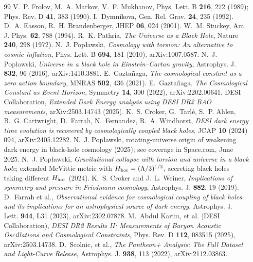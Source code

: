 \documentclass[11pt]{article}
\begin{document}
\begin{thebibliography}{99}
 V.~P. Frolov, M.~A. Markov, V.~F. Mukhanov, Phys. Lett. B \textbf{216}, 272 (1989); Phys. Rev. D \textbf{41}, 383 (1990).
 I.~Dymnikova, Gen. Rel. Grav. \textbf{24}, 235 (1992).
 D.~A. Easson, R.~H. Brandenberger, JHEP \textbf{06}, 024 (2001).
 W.~M. Stuckey, Am. J. Phys. \textbf{62}, 788 (1994).
 R.~K. Pathria, \emph{The Universe as a Black Hole}, Nature \textbf{240}, 298 (1972).
 N.~J. Pop{\l}awski, \emph{Cosmology with torsion: An alternative to cosmic inflation}, Phys. Lett. B \textbf{694}, 181 (2010), arXiv:1007.0587.
 N.~J. Pop{\l}awski, \emph{Universe in a black hole in Einstein--Cartan gravity}, Astrophys. J. \textbf{832}, 96 (2016), arXiv:1410.3881.
 E.~Gazta\~naga, \emph{The cosmological constant as a zero action boundary}, MNRAS \textbf{502}, 436 (2021).
 E.~Gazta\~naga, \emph{The Cosmological Constant as Event Horizon}, Symmetry \textbf{14}, 300 (2022), arXiv:2202.00641.
 DESI Collaboration, \emph{Extended Dark Energy analysis using DESI DR2 BAO measurements}, arXiv:2503.14743 (2025).
 K.~S. Croker, G.~Tarl\'e, S.~P. Ahlen, B.~G. Cartwright, D.~Farrah, N.~Fernandez, R.~A. Windhorst, \emph{DESI dark energy time evolution is recovered by cosmologically coupled black holes}, JCAP \textbf{10} (2024) 094, arXiv:2405.12282.
 N.~J. Pop{\l}awski, rotating-universe origin of weakening dark energy in black-hole cosmology (2025); see coverage in Space.com, June 2025.
 N.~J. Pop{\l}awski, \emph{Gravitational collapse with torsion and universe in a black hole}; extended McVittie metric with $H_{\rm hor} = (\Lambda/3)^{1/2}$, accreting black holes taking different $H_{\rm hor}$ (2024).
 K.~S. Croker and J.~L. Weiner, \emph{Implications of symmetry and pressure in Friedmann cosmology}, Astrophys. J. \textbf{882}, 19 (2019).
 D.~Farrah et al., \emph{Observational evidence for cosmological coupling of black holes and its implications for an astrophysical source of dark energy}, Astrophys. J. Lett. \textbf{944}, L31 (2023), arXiv:2302.07878.
 M.~Abdul Karim, et al. (DESI Collaboration), \emph{DESI DR2 Results II: Measurements of Baryon Acoustic Oscillations and Cosmological Constraints}, Phys. Rev. D \textbf{112}, 083515 (2025), arXiv:2503.14738.
 D.~Scolnic, et al., \emph{The Pantheon+ Analysis: The Full Dataset and Light-Curve Release}, Astrophys. J. \textbf{938}, 113 (2022), arXiv:2112.03863.

\end{thebibliography}
\end{document}
